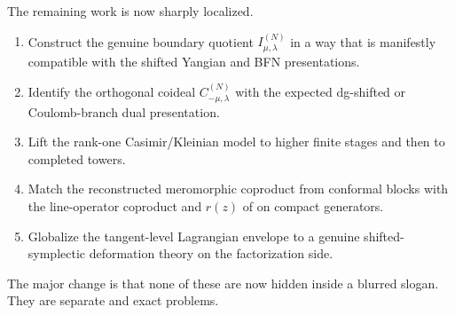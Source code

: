 \begin{remark}
\label{rem:what-remains-open}
The remaining work is now sharply localized.
\begin{enumerate}[label=\textup{(\roman*)}]
\item Construct the genuine boundary quotient $I_{\mu,\lambda}^{(N)}$ in a way that
 is manifestly compatible with the shifted Yangian and BFN presentations.
\item Identify the orthogonal coideal $C_{-\mu,\lambda}^{(N)}$ with the expected
 dg-shifted or Coulomb-branch dual presentation.
\item Lift the rank-one Casimir/Kleinian model to higher finite stages and then
 to completed towers.
\item Match the reconstructed meromorphic coproduct from conformal blocks with
 the line-operator coproduct and $r(z)$ of \cite{DNP25} on compact generators.
\item Globalize the tangent-level Lagrangian envelope to a genuine shifted-
 symplectic deformation theory on the factorization side.
\end{enumerate}
The major change is that none of these are now hidden inside a blurred slogan.
They are separate and exact problems.
\end{remark}
